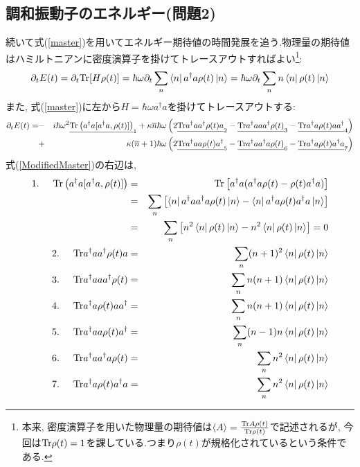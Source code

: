 \documentclass[10.5pt,a4paper]{jreport}
\begin{document}
\subsection{調和振動子のエネルギー(問題2)}
続いて式(\ref{master})を用いてエネルギー期待値の時間発展を追う.物理量の期待値はハミルトニアンに密度演算子を掛けてトレースアウトすればよい\footnote{本来, 密度演算子を用いた物理量の期待値は$\expval{A} = \frac{{\rm Tr}A\rho(t)}{{\rm Tr}\rho(t)}$で記述されるが, 今回は${\rm Tr}\rho(t) = 1$を課している.つまり$\rho(t)$が規格化されているという条件である.}:
\begin{eqnarray}
  \partial_tE(t) = \partial_t{\rm Tr}[H\rho(t)] = \hbar\omega\partial_t\sum_n \bra{n}a^\dagger a\rho(t)\ket{n} = \hbar\omega\partial_t\sum_nn\bra{n}\rho(t)\ket{n}\label{4.1}
\end{eqnarray}
また, 式(\ref{master})に左から$H = \hbar\omega a^\dagger a$を掛けてトレースアウトする:
\begin{eqnarray}
  \nonumber  \partial_tE(t) = &-&i\hbar\omega^2\underline{{\rm Tr}\left(a^\dagger a[a^\dagger a, \rho(t)]\right)}_{\rm 1} + \kappa\overline{n}\hbar\omega\left(2\underline{{\rm Tr}a^\dagger aa^\dagger\rho(t)a}_{\rm 2} - \underline{{\rm Tr}a^\dagger a aa^\dagger\rho(t)}_{\rm 3} - \underline{{\rm Tr}a^\dagger a\rho(t)aa^\dagger}_{\rm 4}\right)\\
  &+&\kappa(\overline{n} + 1)\hbar\omega\left(2\underline{{\rm Tr}a^\dagger aa\rho(t)a^\dagger}_5 - \underline{{\rm Tr}a^\dagger aa^\dagger a\rho(t)}_6 - \underline{{\rm Tr}a^\dagger a\rho(t)a^\dagger a}_7\right)\label{ModifiedMaster}
\end{eqnarray}
式(\ref{ModifiedMaster})の右辺は,
\begin{eqnarray}
  \nonumber  1.\hspace{5mm}{\rm Tr}\left(a^\dagger a[a^\dagger a, \rho(t)]\right) &=& {\rm Tr}\left[a^\dagger a(a^\dagger a\rho(t)-\rho(t)a^\dagger a)\right]\\
  \nonumber  &=&\sum_n\left[\bra{n}a^\dagger aa^\dagger a\rho(t)\ket{n} - \bra{n}a^\dagger a\rho(t)a^\dagger a\ket{n}\right]\\
  &=&\sum_n\left[n^2\bra{n}\rho(t)\ket{n} - n^2\bra{n}\rho(t)\ket{n}\right] = 0\\
  2.\hspace{5mm}{\rm Tr}a^\dagger aa^\dagger\rho(t)a &=& \sum_n(n+1)^2\bra{n}\rho(t)\ket{n}\\
  3.\hspace{5mm}{\rm Tr}a^\dagger aaa^\dagger\rho(t) &=& \sum_nn(n+1)\bra{n}\rho(t)\ket{n}\\
  4.\hspace{5mm}{\rm Tr}a^\dagger a\rho(t)aa^\dagger &=& \sum_nn(n+1)\bra{n}\rho(t)\ket{n}\\
  5.\hspace{5mm}{\rm Tr}a^\dagger aa\rho(t)a^\dagger &=& \sum_n(n-1)n\bra{n}\rho(t)\ket{n}\\
  6.\hspace{5mm}{\rm Tr}a^\dagger aa^\dagger a\rho(t) &=& \sum_nn^2\bra{n}\rho(t)\ket{n}\\
  7.\hspace{5mm}{\rm Tr}a^\dagger a\rho(t)a^\dagger a &=& \sum_nn^2\bra{n}\rho(t)\ket{n}
\end{eqnarray}
\end{document}
